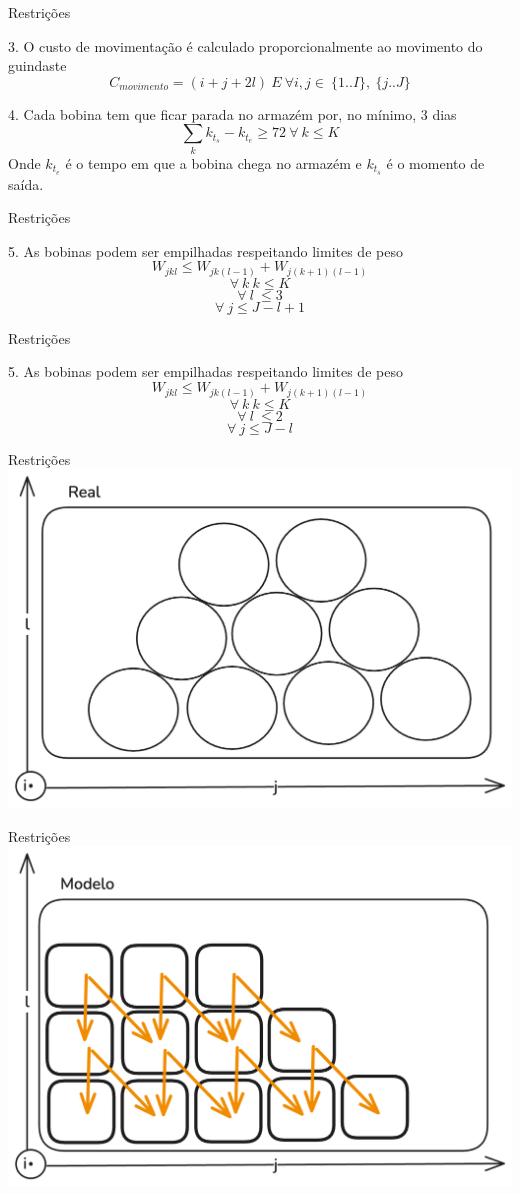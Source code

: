 \begin{frame}{Restrições}
    \begin{block}{3. O custo de movimentação é calculado proporcionalmente ao movimento do guindaste}
        $$C_{movimento} = (i + j + 2l)\ E\ \forall i,j \in\ \{1..I\},\ \{j..J\}$$
    \end{block}
    \begin{block}{4. Cada bobina tem que ficar parada no armazém por, no mínimo, 3 dias}
        $$\sum_{k} k_{t_{s}}-k_{t_{e}} \geq 72\ \forall\ k \leq K$$
        Onde $k_{t_{e}}$ é o tempo em que a bobina chega no armazém e $k_{t_{s}}$ é o momento de saída.
    \end{block}
\end{frame}

\begin{frame}{Restrições}
    \begin{block}{5. As bobinas podem ser empilhadas respeitando limites de peso}
        $$W_{jkl} \leq W_{jk(l-1)} + W_{j(k + 1)(l - 1 )}$$
        $$ \forall\ k\ k\leq K$$        
        $$ \forall\ l\ \leq 3 $$
        $$ \forall\ j \leq J - l + 1$$
    \end{block}
\end{frame}
\begin{frame}{Restrições}
    \begin{block}{5. As bobinas podem ser empilhadas respeitando limites de peso}
        $$W_{jkl} \leq W_{jk(l-1)} + W_{j(k + 1)(l - 1 )}$$
        $$ \forall\ k\ k\leq K$$        
        $$ \forall\ l\ \leq 2 $$
        $$ \forall\ j \leq J - l$$
    \end{block}
\end{frame}
\begin{frame}{Restrições}
    \centering
         \includegraphics[width=0.55\linewidth]{imagens/modelo-peso-real.png}
\end{frame}
\begin{frame}{Restrições}
    \centering
         \includegraphics[width=0.55\linewidth]{imagens/modelo-peso-model.png}
\end{frame}
